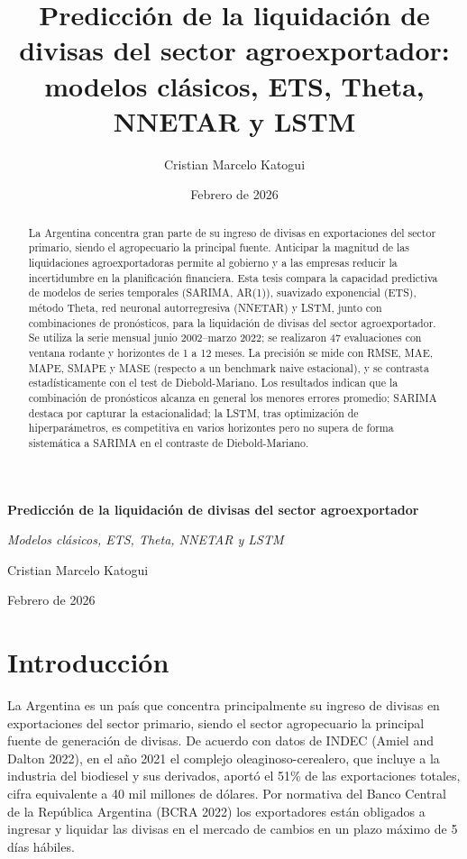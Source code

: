 \documentclass[
  12pt, a4paper, oneside]{article}
\title{Predicción de la liquidación de divisas del sector agroexportador: modelos clásicos, ETS, Theta, NNETAR y LSTM}
\author{Cristian Marcelo Katogui}
\date{Febrero de 2026}
\begin{document}
\maketitle
\begin{abstract}
La Argentina concentra gran parte de su ingreso de divisas en exportaciones del sector primario, siendo el agropecuario la principal fuente. Anticipar la magnitud de las liquidaciones agroexportadoras permite al gobierno y a las empresas reducir la incertidumbre en la planificación financiera. Esta tesis compara la capacidad predictiva de modelos de series temporales (SARIMA, AR(1)), suavizado exponencial (ETS), método Theta, red neuronal autorregresiva (NNETAR) y LSTM, junto con combinaciones de pronósticos, para la liquidación de divisas del sector agroexportador. Se utiliza la serie mensual junio 2002--marzo 2022; se realizaron 47 evaluaciones con ventana rodante y horizontes de 1 a 12 meses. La precisión se mide con RMSE, MAE, MAPE, SMAPE y MASE (respecto a un benchmark naive estacional), y se contrasta estadísticamente con el test de Diebold-Mariano. Los resultados indican que la combinación de pronósticos alcanza en general los menores errores promedio; SARIMA destaca por capturar la estacionalidad; la LSTM, tras optimización de hiperparámetros, es competitiva en varios horizontes pero no supera de forma sistemática a SARIMA en el contraste de Diebold-Mariano.
\end{abstract}

\begin{titlepage}
  \centering
  \vspace*{2cm}
  {\huge\bfseries Predicción de la liquidación de divisas del sector agroexportador \par}
  \vspace{0.5cm}
  {\Large\itshape Modelos clásicos, ETS, Theta, NNETAR y LSTM \par}
  \vspace{2cm}
  {\Large Cristian Marcelo Katogui \par}
  \vspace{0.5cm}
  {\large Febrero de 2026 \par}
  \vfill
\end{titlepage}
\newpage
\tableofcontents
\newpage

\section{Introducción}\label{introducciuxf3n}

La Argentina es un país que concentra principalmente su ingreso de divisas en exportaciones del sector primario, siendo el sector agropecuario la principal fuente de generación de divisas. De acuerdo con datos de INDEC (Amiel and Dalton 2022), en el año 2021 el complejo oleaginoso-cerealero, que incluye a la industria del biodiesel y sus derivados, aportó el 51\% de las exportaciones totales, cifra equivalente a 40 mil millones de dólares. Por normativa del Banco Central de la República Argentina (BCRA 2022) los exportadores están obligados a ingresar y liquidar las divisas en el mercado de cambios en un plazo máximo de 5 días hábiles.
\end{document}

